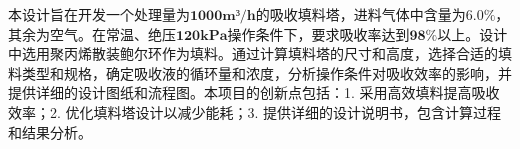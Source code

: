\begin{cabstract}
	本设计旨在开发一个处理量为$\mathbf{1000m³/h}$的吸收填料塔，进料气体中含量为$\mathbf{6.0\%}$，其余为空气。在常温、绝压$\mathbf{120kPa}$操作条件下，要求吸收率达到$\mathbf{98\%}$以上。设计中选用聚丙烯散装鲍尔环作为填料。通过计算填料塔的尺寸和高度，选择合适的填料类型和规格，确定吸收液的循环量和浓度，分析操作条件对吸收效率的影响，并提供详细的设计图纸和流程图。本项目的创新点包括：1. 采用高效填料提高吸收效率；2. 优化填料塔设计以减少能耗；3. 提供详细的设计说明书，包含计算过程和结果分析。
\end{cabstract}